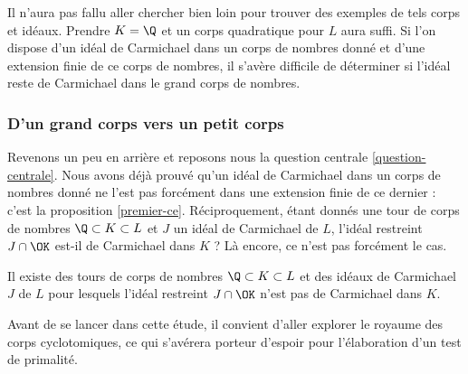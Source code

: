 \begin{remarque}
	Il n'aura pas fallu aller chercher bien loin pour trouver des exemples de tels corps et idéaux. Prendre $K = \Q$ et un corps quadratique pour $L$ aura suffi. Si l'on dispose d'un idéal de Carmichael dans un corps de nombres donné et d'une extension finie de ce corps de nombres, il s'avère difficile de déterminer si l'idéal reste de Carmichael dans le grand corps de nombres.
\end{remarque}

\subsubsection{D'un grand corps vers un petit corps}

Revenons un peu en arrière et reposons nous la question centrale \ref{question-centrale}. Nous avons déjà prouvé qu'un idéal de Carmichael dans un corps de nombres donné ne l'est pas forcément dans une extension finie de ce dernier : c'est la proposition \ref{premier-ce}. Réciproquement, étant donnés une tour de corps de nombres $\Q\subset K \subset L$ et $J$ un idéal de Carmichael de $L$, l'idéal restreint $J\cap \OK$ est-il de Carmichael dans $K$ ? Là encore, ce n'est pas forcément le cas.

\begin{proposition}\label{deuxieme-ce}
	Il existe des tours de corps de nombres $\Q\subset K \subset L$ et des idéaux de Carmichael $J$ de $L$ pour lesquels l'idéal restreint $J\cap \OK$ n'est pas de Carmichael dans $K$.
\end{proposition}

Avant de se lancer dans cette étude, il convient d'aller explorer le royaume des corps cyclotomiques, ce qui s'avérera porteur d'espoir pour l'élaboration d'un test de primalité. 
